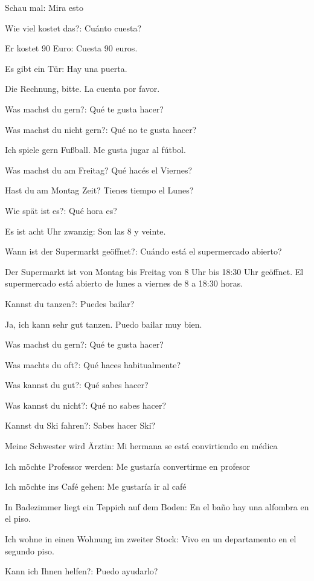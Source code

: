 \begin{myitemize}
\item Schau mal: Mira esto
\item Wie viel kostet das?: Cuánto cuesta?
\item Er kostet 90 Euro: Cuesta 90 euros.
\item Es gibt ein Tür: Hay una puerta.
\item Die Rechnung, bitte. La cuenta por favor.
\item Was machst du gern?: Qué te gusta hacer?
\item Was machst du nicht gern?: Qué no te gusta hacer? 
\item Ich spiele gern Fußball. Me gusta jugar al fútbol.
\item Was machst du am Freitag? Qué hacés el Viernes? 
\item Hast du am Montag Zeit? Tienes tiempo el Lunes? 
\item Wie spät ist es?: Qué hora es?
\item Es ist acht Uhr zwanzig: Son las 8 y veinte.
\item Wann ist der Supermarkt geöffnet?: Cuándo está el supermercado abierto?
\item Der Supermarkt ist von Montag bis Freitag von 8 Uhr bis 18:30 Uhr geöffnet. El supermercado está abierto de lunes a viernes de 8 a 18:30 horas.
\item Kannst du tanzen?: Puedes bailar?
\item Ja, ich kann sehr gut tanzen. Puedo bailar muy bien.
\item Was machst du gern?: Qué te gusta hacer?
\item Was machts du oft?: Qué haces habitualmente?
\item Was kannst du gut?: Qué sabes hacer?
\item Was kannst du nicht?: Qué no sabes hacer?
\item Kannst du Ski fahren?: Sabes hacer Ski?
\item Meine Schwester wird Ärztin: Mi hermana se está convirtiendo en médica
\item Ich möchte Professor werden: Me gustaría convertirme en profesor
\item Ich möchte ins Café gehen: Me gustaría ir al café
\item In Badezimmer liegt ein Teppich auf dem Boden: En el baño hay una alfombra en el piso.
\item Ich wohne in einen Wohnung im zweiter Stock: Vivo en un departamento en el segundo piso.
\item Kann ich Ihnen helfen?: Puedo ayudarlo?

\end{myitemize}
